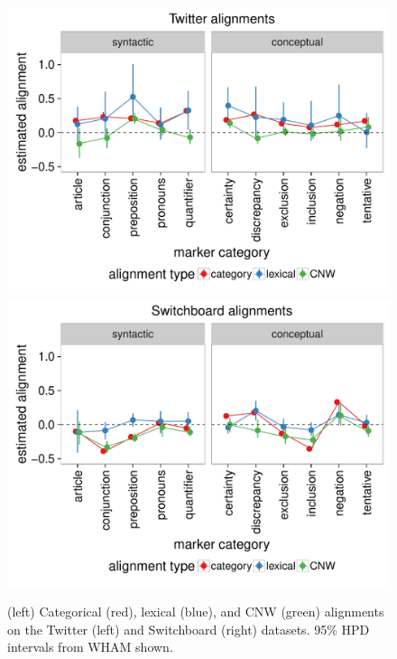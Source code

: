 \documentclass[11pt]{article}
\begin{document}
\begin{figure}[t]
  \begin{center}
    \includegraphics[width=\columnwidth]{results/twitter_line.pdf}
    \includegraphics[width=\columnwidth]{results/swbda_line.pdf}
  \end{center}
  \caption{(left) Categorical (red), lexical (blue), and CNW (green) alignments on the Twitter (left) and Switchboard (right) datasets. 95\% HPD intervals from WHAM shown.}\label{fig:all-res}
\end{figure}
\end{document}
